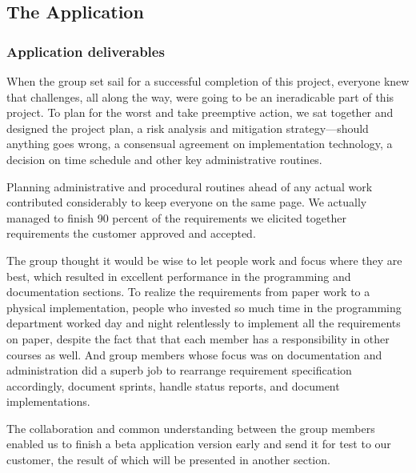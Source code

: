 \subsection{The Application}
    \subsubsection{Application deliverables}
    When the group set sail for a successful completion of this project, everyone knew that challenges, all along the way, were going to be an ineradicable part of this project. To plan for the worst and take preemptive action, we sat together and designed the project plan, a risk analysis and mitigation strategy---should anything goes wrong, a consensual agreement on implementation technology, a decision on time schedule and other key administrative routines.

    Planning administrative and procedural routines ahead of any actual work contributed considerably to keep everyone on the same page. We actually managed to finish 90 percent of the requirements we elicited together requirements the customer approved and accepted.

    The group thought it would be wise to let people work and focus where they are best, which resulted in excellent performance in the programming and documentation sections. To realize the requirements from paper work to a physical implementation, people who invested so much time in the programming department worked day and night relentlessly to implement all the requirements on paper, despite the fact that that each member has a responsibility in other courses as well. And group members whose focus was on documentation and administration did a superb job to rearrange requirement specification accordingly, document sprints, handle status reports, and document implementations.

    The collaboration and common understanding between the group members enabled us to finish a beta application version early and send it for test to our customer, the result of which will be presented in another section.

